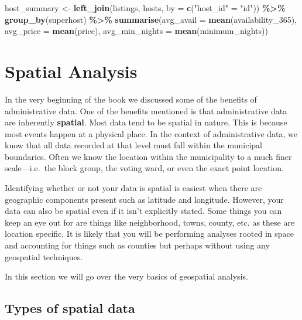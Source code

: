 \documentclass[
]{book}
\newenvironment{Shaded}{\begin{snugshade}}{\end{snugshade}}
\newcommand{\DataTypeTok}[1]{\textcolor[rgb]{0.13,0.29,0.53}{#1}}
\newcommand{\DecValTok}[1]{\textcolor[rgb]{0.00,0.00,0.81}{#1}}
\newcommand{\KeywordTok}[1]{\textcolor[rgb]{0.13,0.29,0.53}{\textbf{#1}}}
\newcommand{\NormalTok}[1]{#1}
\newcommand{\OperatorTok}[1]{\textcolor[rgb]{0.81,0.36,0.00}{\textbf{#1}}}
\newcommand{\StringTok}[1]{\textcolor[rgb]{0.31,0.60,0.02}{#1}}
\begin{document}
\begin{Shaded}
\begin{Highlighting}[]
\NormalTok{host\_summary \textless{}{-}}\StringTok{ }\KeywordTok{left\_join}\NormalTok{(listings, hosts, }\DataTypeTok{by =} \KeywordTok{c}\NormalTok{(}\StringTok{"host\_id"}\NormalTok{ =}\StringTok{ "id"}\NormalTok{)) }\OperatorTok{\%\textgreater{}\%}\StringTok{ }
\StringTok{  }\KeywordTok{group\_by}\NormalTok{(superhost) }\OperatorTok{\%\textgreater{}\%}\StringTok{ }
\StringTok{  }\KeywordTok{summarise}\NormalTok{(}\DataTypeTok{avg\_avail =} \KeywordTok{mean}\NormalTok{(availability\_}\DecValTok{365}\NormalTok{),}
            \DataTypeTok{avg\_price =} \KeywordTok{mean}\NormalTok{(price),}
            \DataTypeTok{avg\_min\_nights =} \KeywordTok{mean}\NormalTok{(minimum\_nights))}
\end{Highlighting}
\end{Shaded}

\hypertarget{spatial-analysis}{%
\chapter{Spatial Analysis}\label{spatial-analysis}}

In the very beginning of the book we discussed some of the benefits of administrative data. One of the benefits mentioned is that administrative data are inherently \textbf{spatial}. Most data tend to be spatial in nature. This is because most events happen at a physical place. In the context of administrative data, we know that all data recorded at that level must fall within the municipal boundaries. Often we know the location within the municipality to a much finer scale---i.e.~the block group, the voting ward, or even the exact point location.

Identifying whether or not your data is spatial is easiest when there are geographic components present such as latitude and longitude. However, your data can also be spatial even if it isn't explicitly stated. Some things you can keep an eye out for are things like neighborhood, towns, county, etc. as these are location specific. It is likely that you will be performing analyses rooted in space and accounting for things such as counties but perhaps without using any geospatial techniques.

In this section we will go over the very basics of geospatial analysis.

\hypertarget{types-of-spatial-data}{%
\section{Types of spatial data}\label{types-of-spatial-data}}
\end{document}
